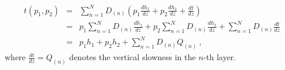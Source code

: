 \begin{eqnarray}
\nonumber
t(p_1,p_2) & = & \sum\limits^N_{n=1} D_{(n)} \left( p_1 \frac{dh_1}{dz} + p_2\frac{dh_2}{dz} + \frac{dt}{dz} \right)\\
\nonumber
            & = & p_1 \sum\limits^N_{n=1} D_{(n)}\frac{dh_1}{dz} + p_2 \sum\limits^N_{n=1} D_{(n)}\frac{dh_2}{dz} + \sum\limits^N_{n=1} D_{(n)}\frac{dt}{dz}\\
            & = & p_1 h_1 + p_2 h_2 + \sum\limits^N_{n=1} D_{(n)}Q_{(n)}~,
\end{eqnarray}
where $\frac{dt}{dz} = Q_{(n)}$ denotes the vertical slowness in the $n$-th layer.

